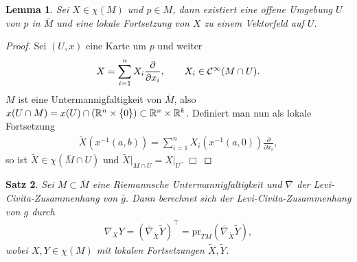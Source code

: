 \documentclass[12pt,a4paper]{article}
\def\R{\mathbb{R}}
\def\pr{\mathrm{pr}}
\newtheorem{Lemma}{Lemma}[section]
\newtheorem{Satz}[Lemma]{Satz}
\def\qed{\quad\hfill\ensuremath{\Box}}
\begin{document}
\begin{Lemma}
Sei $X\in\chi(M)$ und $p\in M$, dann existiert eine offene Umgebung $U$ von $p$
in $\bar{M}$ und eine lokale Fortsetzung von $X$ zu einem Vektorfeld auf $U$. 
\end{Lemma}
\begin{proof}
Sei $(U,x)$ eine Karte um $p$ und weiter
\begin{align*}
X= \sum_{i=1}^n X_i
\frac{\partial}{\partial x_i},
\qquad
X_i\in\mathcal{C}^\infty(M\cap U).
\end{align*}
$M$ ist eine Untermannigfaltigkeit von $\bar{M}$, also
$x(U\cap M) = x(U)\cap (\R^n\times\setd{0}) \subset \R^n\times \R^k$.
Definiert man nun als lokale Fortsetzung
\begin{align*}
\tilde{X}(x^{-1}(a,b)) = \sum_{i=1}^n X_i(x^{-1}(a,0)) \frac{\partial}{\partial
x_i},
\end{align*}
so ist $\tilde{X}\in\chi(\bar{M}\cap U)$ und $\tilde{X}\big|_{M\cap U} =
X\big|_U$.
\qed
\end{proof}

\begin{Satz}
Sei $M\subset\bar{M}$ eine Riemannsche Untermannigfaltigkeit und $\bar{\nabla}$
der Levi-Civita-Zusammenhang von $\bar{g}$. Dann berechnet sich der
Levi-Civita-Zusammenhang von $g$ durch
\begin{align*}
\nabla_XY = \left(\bar{\nabla}_{\tilde{X}}\tilde{Y} \right)^\top = 
\pr_{TM}\left(\bar{\nabla}_{\tilde{X}}\tilde{Y} \right),
\end{align*}
wobei $X,Y\in\chi(M)$ mit lokalen Fortsetzungen $\tilde{X},\tilde{Y}$.
\end{Satz}
\end{document}
